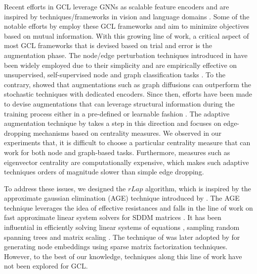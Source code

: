 \documentclass{article}
\theoremstyle{plain}
\theoremstyle{definition}
\theoremstyle{remark}
\begin{document}
Recent efforts in GCL leverage GNNs as scalable feature encoders and are inspired by techniques/frameworks in vision \citep{gidaris2018unsupervised, hjelm2018learning, chen2020simple, jing2020self} and language domains \citep{mikolov2013efficient, devlin2018bert, radford2018improving, lan2019albert}. Some of the notable efforts by \citet{velickovic2019deep, sun2019infograph, zhu2020deep, you2020graph, hassani2020contrastive} employ these GCL frameworks and aim to minimize objectives based on mutual information. With this growing line of work, a critical aspect of most GCL frameworks that is devised based on trial and error is the augmentation phase. The node/edge perturbation techniques introduced in \citet{you2020graph} have been widely employed due to their simplicity and are empirically effective on unsupervised, self-supervised node and graph classification tasks \citep{zhu2021empirical, thakoor2021bootstrapped}. To the contrary, \citet{hassani2020contrastive} showed that augmentations such as graph diffusions can outperform the stochastic techniques with dedicated encoders. Since then, efforts have been made to devise augmentations that can leverage structural information during the training process either in a pre-defined \citep{zhu2021graph} or learnable fashion \citep{yin2022autogcl}. The adaptive augmentation technique by \citet{zhu2021graph} takes a step in this direction and focuses on edge-dropping mechanisms based on centrality measures. We observed in our experiments that, it is difficult to choose a particular centrality measure that can work for both node and graph-based tasks. Furthermore, measures such as eigenvector centrality are computationally expensive, which makes such adaptive techniques orders of magnitude slower than simple edge dropping. 

To address these issues, we designed the $rLap$ algorithm, which is inspired by the approximate gaussian elimination (AGE) technique introduced by \citet{kyng2016approximate}. The AGE technique leverages the idea of effective resistances \citep{spielman2008graph} and falls in the line of work on fast approximate linear system solvers for SDDM matrices \citep{spielman2003solving, spielman2004nearly, koutis2011nearly, cohen2014solving, kyng2016sparsified}. It has been influential in efficiently solving linear systems of equations \citep{cohen2018solving, peng2021solving, cohen2021solving, chen2021rchol}, sampling random spanning trees \citep{durfee2017sampling} and matrix scaling \citep{cohen2017matrix}. The technique of \citet{kyng2016approximate} was later adopted by \citet{fahrbach2020faster} for generating node embeddings using sparse matrix factorization techniques. However, to the best of our knowledge, techniques along this line of work have not been explored for GCL.
\end{document}
